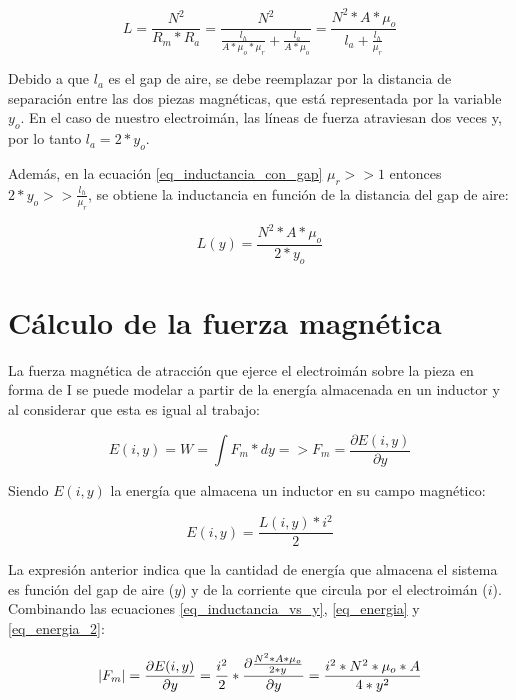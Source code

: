 \begin{equation}\label{eq_inductancia_con_gap}
L=\frac{N^{2}}{R_{m}*R_{a}}=\frac{N^{2}}{\frac{l_{h}}{A*\mu_{o}*\mu_{r}}+\frac{l_{a}}{A*\mu_{o}}}=\frac{N^{2}*A*\mu_{o}}{l_{a}+\frac{l_{h}}{\mu_{r}}}
\end{equation}

\noindent Debido a que $l_{a}$ es el gap de aire, se debe reemplazar por la distancia de separación entre las dos piezas magnéticas, que está representada por la variable $y_{o}$. En el caso de nuestro electroimán, las líneas de fuerza atraviesan dos veces y, por lo tanto $l_{a}=2*y_{o}$.

\noindent Además, en la ecuación \ref{eq_inductancia_con_gap} $\mu_{r}>>1$ entonces $2*y_{o}>>\frac{l_{h}}{\mu_{r}}$, se obtiene la inductancia en función de la distancia del gap de aire:

\begin{equation}\label{eq_inductancia_vs_y}
		L(y)=\frac{{N^{2}*A*\mu_{o}}}{2*y_{o}}
\end{equation}

\section{Cálculo de la fuerza magnética}

\noindent La fuerza magnética de atracción que ejerce el electroimán sobre la pieza en forma de I se puede modelar a partir de la energía almacenada en un inductor y al considerar que esta es igual al trabajo:

\begin{equation}\label{eq_energia}
	E(i,y)=W=\int{F_{m}*dy}=>F_{m}=\frac{\partial{E(i,y)}}{\partial{y}}
\end{equation}

\noindent Siendo $E(i,y)$ la energía que almacena un inductor en su campo magnético:

\begin{equation}\label{eq_energia_2}
	E(i,y)=\frac{L(i,y)*i^{2}}{2}
\end{equation}

\noindent La expresión anterior indica que la cantidad de energía que almacena el sistema es función del gap de aire ($y$) y de la corriente que circula por el electroimán ($i$). Combinando las ecuaciones \ref{eq_inductancia_vs_y}, \ref{eq_energia} y \ref{eq_energia_2}:

\begin{equation}\label{eq_fuerza_magnetica}
	\lvert F_{m}\rvert=\frac{\partial{E(i,y)}}{\partial{y}}=\frac{i^{2}}{2}*\frac{\partial{\frac{{N^{2}*A*\mu_{o}}}{2*y}}}{\partial{y}}=\frac{i^{2}*N^{2}*\mu_{o}*A}{4*y^{2}}
\end{equation}


